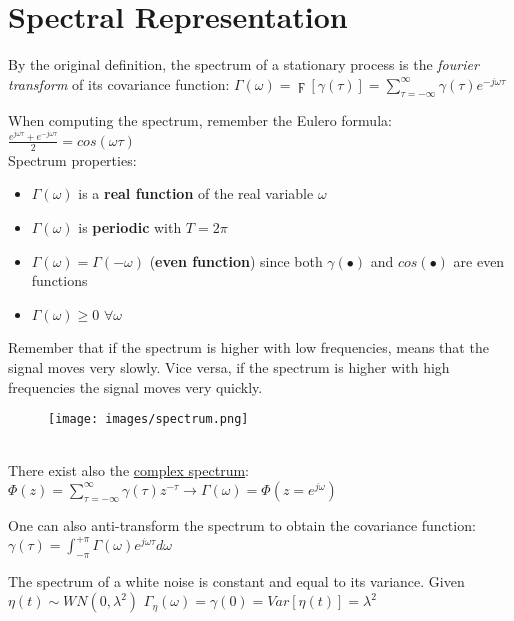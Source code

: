 \documentclass[10pt,a4paper]{article}
\begin{document}
\section{Spectral Representation}
By the original definition, the spectrum of a stationary process is the \textit{fourier transform} of its covariance function:
\center
 $\Gamma(\omega)=\digamma[\gamma(\tau)]=\sum_{\tau=-\infty}^{\infty} \gamma(\tau)e^{-j \omega \tau}$
 \\
 \vspace{0.5em}
 \raggedright
 When computing the spectrum, remember the Eulero formula:
 $\frac{e^{j \omega \tau}+e^{-j \omega \tau}}{2} = cos(\omega \tau)$
 \\
 Spectrum properties:
 \begin{itemize}
 	\item $\Gamma(\omega)$ is a \textbf{real function} of the real variable $\omega$
 	\item $\Gamma(\omega)$ is \textbf{periodic} with $T=2 \pi$
 	\item $\Gamma(\omega) =\Gamma(-\omega)$ (\textbf{even function}) since both $\gamma(\bullet)$ and $cos(\bullet)$ are even functions
 	\item $\Gamma(\omega) \geq 0$  $\forall \omega$
 \end{itemize}
 Remember that if the spectrum is higher with low frequencies, means that the signal moves very slowly. Vice versa, if the spectrum is higher with high frequencies the signal moves very quickly. 
 \begin{figure}[h!]
 \hfill \texttt{[image: images/spectrum.png]}\hspace*{\fill}
  \label{fig:spectrum}
\end{figure} \\
 There exist also the \uline{complex spectrum}:
 \center
 $\Phi (z)=\sum_{\tau=-\infty}^{\infty} \gamma (\tau)z^{-\tau} \rightarrow \Gamma(\omega)=\Phi(z=e^{j \omega})$
 \\
 \raggedright
 \vspace{0.5em}
 One can also anti-transform the spectrum to obtain the covariance function:
  \center
 $\gamma(\tau)=\int_{-\pi}^{+\pi} \Gamma(\omega)e^{j \omega \tau} d\omega$
 \\
 \vspace{0.5em}
 \raggedright
  The spectrum of a white noise is constant and equal to its variance.
 Given  $\eta(t) \sim WN(0,\lambda^2)$
 \center 
$\Gamma_\eta(\omega) = \gamma(0) = Var[\eta(t)] = \lambda^2$
\\
\raggedright
\end{document}
